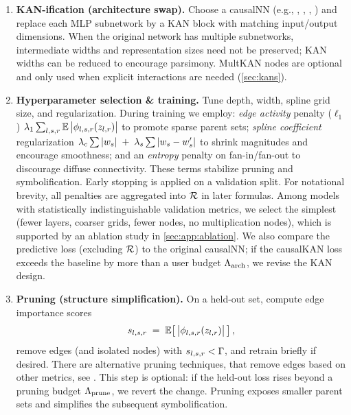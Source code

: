 \begin{enumerate}
    \item \textbf{KAN-ification (architecture swap).} Choose a causalNN (e.g., \skan, \tkan, \tarkan, \dragonkan) and replace each MLP subnetwork by a KAN block with matching input/output dimensions. When the original network has multiple subnetworks, intermediate widths and representation sizes need not be preserved; KAN widths can be reduced to encourage parsimony. MultKAN nodes are optional and only used when explicit interactions are needed (\cref{sec:kans}).

    \item \textbf{Hyperparameter selection \& training.} Tune depth, width, spline grid size, and regularization. During training we employ:
    \itemi \emph{edge activity} penalty ($\ell_1$) 
    $
    \lambda_1 \sum_{l,s,r}\operatorname{\mathbb{E}}\big|\phi_{l,s,r}(z_{l,r})\big|
    $
    to promote sparse parent sets;
    \itemii \emph{spline coefficient} regularization 
    $
    \lambda_c \sum |w_s| \;+\; \lambda_s \sum |w_s-w_s'|
    $
    to shrink magnitudes and encourage smoothness; and
    \itemiii an \emph{entropy} penalty on fan-in/fan-out to discourage diffuse connectivity.
    These terms stabilize pruning and symbolification. Early stopping is applied on a validation split. For notational brevity, all penalties are aggregated into $\mathcal{R}$ in later formulas. Among models with statistically indistinguishable validation metrics, we select the simplest (fewer layers, coarser grids, fewer nodes, no multiplication nodes), which is supported by an ablation study in \cref{sec:app:ablation}. We also compare the predictive loss (excluding $\mathcal{R}$) to the original causalNN; if the causalKAN loss exceeds the baseline by more than a user budget $\Lambda_\text{arch}$, we revise the KAN design.

    \item \textbf{Pruning (structure simplification).} On a held-out set, compute edge importance scores
    \begin{equation}
    s_{l,s,r} \;=\; \operatorname{\mathbb{E}}\!\left[\,\big|\phi_{l,s,r}(z_{l,r})\big|\,\right],
    \end{equation}
    remove edges (and isolated nodes) with $s_{l,s,r}<\Gamma$, and retrain briefly if desired. There are alternative pruning techniques, that remove edges based on other metrics, see \citep{liu2024kan2}. This step is optional: if the held-out loss rises beyond a pruning budget $\Lambda_\text{prune}$, we revert the change. Pruning exposes smaller parent sets and simplifies the subsequent symbolification.


\end{enumerate}
